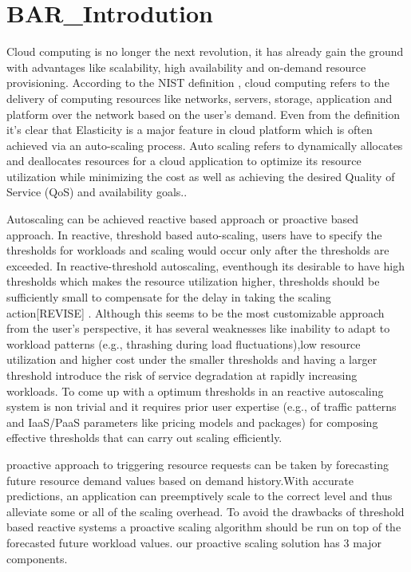\section{BAR_Introdution}

Cloud computing is no longer the next revolution, it has already gain the ground with advantages like scalability, high availability and on-demand resource provisioning. According to the NIST definition \cite{Mell_2011} ,  cloud computing refers to the delivery of computing resources like networks, servers, storage, application and platform over the network based on the user’s demand. Even from the definition it’s clear that Elasticity is a major feature in cloud platform which is often achieved via an auto-scaling process. Auto scaling refers to  dynamically allocates and deallocates resources for a cloud application to optimize its resource utilization while minimizing the cost as well as achieving the desired Quality of Service (QoS) and availability goals.\cite{Roy_2011}\cite{Armbrust_2010}.

Autoscaling can be achieved  reactive based approach or proactive based approach. In reactive, threshold based auto-scaling, users have to specify the thresholds for workloads  and scaling would occur only after the thresholds are exceeded\cite{Lorido_Botran_2014}. In reactive-threshold autoscaling, eventhough its desirable to have high thresholds which makes the resource utilization higher, thresholds should be sufficiently small to compensate for the delay in taking the scaling action[REVISE] .    Although this seems to be the most customizable approach from the user’s perspective, it has several weaknesses \cite{Alipour:2014:AAI:2735522.2735532} like inability to adapt to workload patterns (e.g., thrashing during load fluctuations),low resource utilization and higher cost under the smaller thresholds and having a larger threshold introduce the risk of service degradation at rapidly increasing workloads. To come up with a optimum thresholds in an reactive autoscaling system is non trivial and it requires prior user expertise (e.g., of traffic patterns and IaaS/PaaS parameters like pricing models and packages) for composing effective thresholds that can carry out scaling efficiently.

proactive approach to triggering resource requests can be taken by forecasting future resource demand values based on demand history.With accurate predictions, an application can preemptively scale to the correct level and thus alleviate
some or all of the scaling overhead.
To avoid the drawbacks of threshold based reactive systems a proactive scaling algorithm should be run on top of the forecasted future workload values. our proactive scaling solution has 3 major components.

